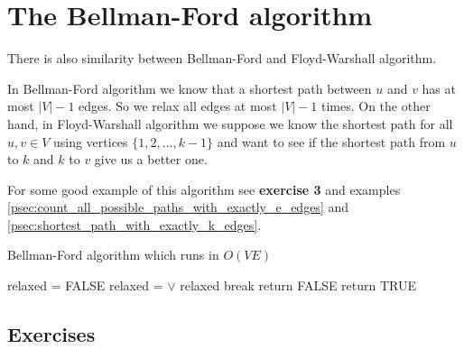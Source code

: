 \documentclass{book}
\begin{document}
	\section{The Bellman-Ford algorithm}
		There is also similarity between Bellman-Ford and Floyd-Warshall algorithm.
		\par In Bellman-Ford algorithm we know that a shortest path between $u$ and $v$ has at most $|V| - 1$ edges. So we relax all edges at most $|V| - 1$ times. On the other hand, in Floyd-Warshall algorithm we suppose we know the shortest path for all $u, v \in V$ using vertices $\{1, 2, \dots, k - 1\}$ and want to see if the shortest path from $u$ to $k$ and $k$ to $v$ give us a better one.
		\par For some good example of this algorithm see \textbf{exercise 3} and examples \ref{psec:count_all_possible_paths_with_exactly_e_edges} and \ref{psec:shortest_path_with_exactly_k_edges}.
		\begin{algorithm}[h!]
			\caption{Bellman-Ford algorithm which runs in $O(VE)$}
			\begin{algorithmic}[1]
					\State {}
						\State relaxed = FALSE
							\State relaxed =  $\lor$ relaxed
						\EndFor
							\State break
						\EndIf
					\EndFor
							\State return FALSE
						\EndIf
					\EndFor
					\State return TRUE
				\EndFunction
			\end{algorithmic}
		\end{algorithm}
		\FloatBarrier	
	\subsection{Exercises}
\end{document}
